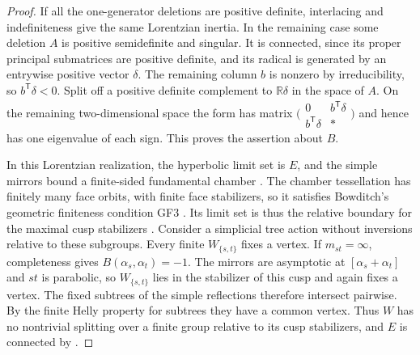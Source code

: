 \documentclass[11pt,reqno]{amsart}
\theoremstyle{plain}
\theoremstyle{definition}
\theoremstyle{remark}
\numberwithin{equation}{section}
\begin{document}
\begin{proof}
If all the one-generator deletions are positive definite,
interlacing and indefiniteness give the same Lorentzian inertia.
In the remaining case some deletion $A$ is positive semidefinite
and singular. It is connected, since its proper principal
submatrices are positive definite, and its radical is generated
by an entrywise positive vector $\delta$. The remaining column
$b$ is nonzero by irreducibility, so $b^{\mathsf T}\delta<0$.
Split off a positive definite complement to $\mathbb R\delta$ in
the space of $A$. On the remaining two-dimensional space the
form has matrix
$\bigl(\begin{smallmatrix}0&b^{\mathsf T}\delta\\
b^{\mathsf T}\delta&*\end{smallmatrix}\bigr)$ and hence has
one eigenvalue of each sign. This proves the assertion about $B$.

In this Lorentzian realization, the hyperbolic limit set is $E$,
and the simple mirrors bound a finite-sided fundamental chamber
\cite[Theorem~1.1 and Proposition~3.11]{HPR2020}.
The chamber tessellation has finitely many face orbits, with
finite face stabilizers, so it satisfies Bowditch's geometric
finiteness condition GF3 \cite[Section~3.5]{Bowditch1993}. Its limit
set is thus the relative boundary for the maximal cusp stabilizers
\cite[Theorem~9.4]{Bowditch}. Consider a simplicial
tree action without inversions relative to these subgroups. Every
finite $W_{\{s,t\}}$ fixes a vertex. If $m_{st}=\infty$, completeness
gives $B(\alpha_s,\alpha_t)=-1$. The mirrors are asymptotic at
$[\alpha_s+\alpha_t]$ and $st$ is parabolic, so
$W_{\{s,t\}}$ lies in the stabilizer of this cusp and again fixes
a vertex. The fixed subtrees of the simple reflections therefore
intersect pairwise. By the finite Helly property for subtrees they
have a common vertex. Thus $W$ has no nontrivial splitting over
a finite group relative to its cusp stabilizers, and $E$ is
connected by \cite[Proposition~10.1]{Bowditch}.
\end{proof}
\end{document}
